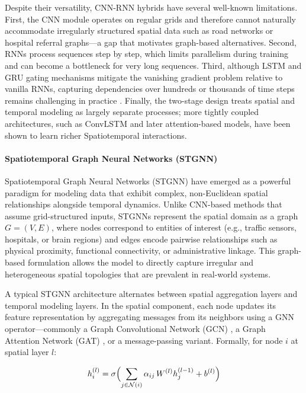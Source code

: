 \documentclass[acmsmall]{acmart}
\begin{document}
Despite their versatility, CNN-RNN hybrids have several well-known limitations. First, the CNN module operates on regular grids and therefore cannot naturally accommodate irregularly structured spatial data such as road networks or hospital referral graphs—a gap that motivates graph-based alternatives. Second, RNNs process sequences step by step, which limits parallelism during training and can become a bottleneck for very long sequences. Third, although LSTM and GRU gating mechanisms mitigate the vanishing gradient problem relative to vanilla RNNs, capturing dependencies over hundreds or thousands of time steps remains challenging in practice \cite{bengio1994learning}. Finally, the two-stage design treats spatial and temporal modeling as largely separate processes; more tightly coupled architectures, such as ConvLSTM and later attention-based models, have been shown to learn richer Spatiotemporal interactions.
 
\paragraph{Spatiotemporal Graph Neural Networks (STGNN)}
Spatiotemporal Graph Neural Networks (STGNN) \cite{shao2022longterm} have emerged as a powerful paradigm for modeling data that exhibit complex, non-Euclidean spatial relationships alongside temporal dynamics. Unlike CNN-based methods that assume grid-structured inputs, STGNNs represent the spatial domain as a graph $G = (V, E)$, where nodes correspond to entities of interest (e.g., traffic sensors, hospitals, or brain regions) and edges encode pairwise relationships such as physical proximity, functional connectivity, or administrative linkage. This graph-based formulation allows the model to directly capture irregular and heterogeneous spatial topologies that are prevalent in real-world systems.
 
A typical STGNN architecture alternates between spatial aggregation layers and temporal modeling layers. In the spatial component, each node updates its feature representation by aggregating messages from its neighbors using a GNN operator—commonly a Graph Convolutional Network (GCN) \cite{kipf2017gcn}, a Graph Attention Network (GAT) \cite{velickovic2018gat}, or a message-passing variant. Formally, for node $i$ at spatial layer $l$:
 
\begin{equation}
h_i^{(l)} = \sigma \Bigl( \sum_{j \in \mathcal{N}(i)} \alpha_{ij} \, W^{(l)} h_j^{(l-1)} + b^{(l)} \Bigr)
\end{equation}
 
\end{document}
